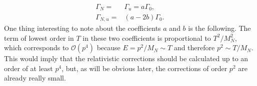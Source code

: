 \begin{align}
	\Gamma_N=&\Gamma_u=a\Gamma_0,\\
	\Gamma_{N,u}=&(a-2b)\Gamma_0.
\end{align}
One thing interesting to note about the coefficients $a$ and $b$ is the following. The term of lowest order in $T$ in these two coefficients is proportional to $T^2/M_N^2$, which corresponds to $\mathcal{O}(p^4)$ because $E=p^2/M_N\sim T$ and therefore $p^2\sim T/M_N$. This would imply that the relativistic corrections should be calculated up to an order of at least $p^4$, but, as will be obvious later, the corrections of order $p^2$ are already really small.
